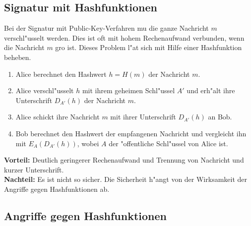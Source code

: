 \subsection{Signatur mit Hashfunktionen}

Bei der Signatur mit Public-Key-Verfahren mu\3 die ganze Nachricht $m$
verschl"usselt werden. Dies ist oft mit hohem Rechenaufwand verbunden,
wenn die Nachricht $m$ gro\3 ist. Dieses Problem l"a\3t sich mit Hilfe
einer Hashfunktion beheben.
\begin{enumerate}
  \item Alice berechnet den Hashwert $h=H(m)$ der Nachricht $m$.
  \item Alice verschl"usselt $h$ mit ihrem geheimen Schl"ussel $A'$ 
        und erh"alt ihre Unterschrift $D_{A'}(h)$ der Nachricht $m$.
  \item Alice schickt ihre Nachricht $m$ mit ihrer Unterschrift $D_{A'}(h)$ 
        an Bob.
  \item Bob berechnet den Hashwert der empfangenen Nachricht und
        vergleicht ihn mit $E_{A}(D_{A'}(h))$, wobei $A$ der
        "offentliche Schl"ussel von Alice ist.
\end{enumerate}

{\bf Vorteil:} Deutlich geringerer Rechenaufwand und Trennung von
Nachricht und kurzer Unterschrift. \\
{\bf Nachteil:} Es ist nicht so sicher. Die Sicherheit h"angt von der
Wirksamkeit der Angriffe gegen Hashfunktionen ab.

\subsection{Angriffe gegen Hashfunktionen}

